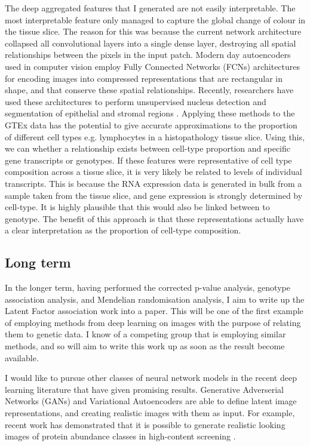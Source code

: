 \documentclass[graybox]{svmult}
\begin{document}
The deep aggregated features that I generated are not easily interpretable. The most interpretable feature only managed to capture the global change of colour in the tissue slice. The reason for this was because the current network architecture collapsed all convolutional layers into a single dense layer, destroying all spatial relationships between the pixels in the input patch. Modern day autoencoders used in computer vision employ Fully Connected Networks (FCNs) \cite{fully-convolutional-networks} architectures for encoding images into compressed representations that are rectangular in shape, and that conserve these spatial relationships. Recently, researchers have used these architectures to perform unsupervised nucleus detection \cite{sparse-autoencoders}  and segmentation of epithelial and stromal regions \cite{segmenting-classifying-epithelial}. Applying these methods to the GTEx data has the potential to give accurate approximations to the proportion of different cell types e.g. lymphocytes in a histopathology tissue slice. Using this, we can whether a relationship exists between cell-type proportion and specific gene transcripts or genotypes. If these features were representative of cell type composition across a tissue slice, it is very likely be related to levels of individual transcripts. This is because the RNA expression data is generated in bulk from a sample taken from the tissue slice, and gene expression is strongly determined by cell-type. It is highly plausible that this would also be linked between to genotype. The benefit of this approach is that these representations actually have a clear interpretation as the proportion of cell-type composition.


\subsection{Long term}

In the longer term, having performed the corrected p-value analysis, genotype association analysis, and Mendelian randomisation analysis, I aim to write up the Latent Factor association work into a paper. This will be one of the first example of employing methods from deep learning on images with the purpose of relating them to genetic data. I know of a competing group that is employing similar methods, and so will aim to write this work up as soon as the result become available.

I would like to pursue other classes of neural network models in the recent deep learning literature that have given promising results. Generative Adverserial Networks (GANs) \cite{generative-adverserial-networks} and Variational Autoencoders \cite{variational-autoencoders} are able to define latent image representations, and creating realistic images with them as input. For example, recent work has demonstrated that it is possible to generate realistic looking images of protein abundance classes in high-content screening \cite{gans-biological-image-synthesis}.
\end{document}
